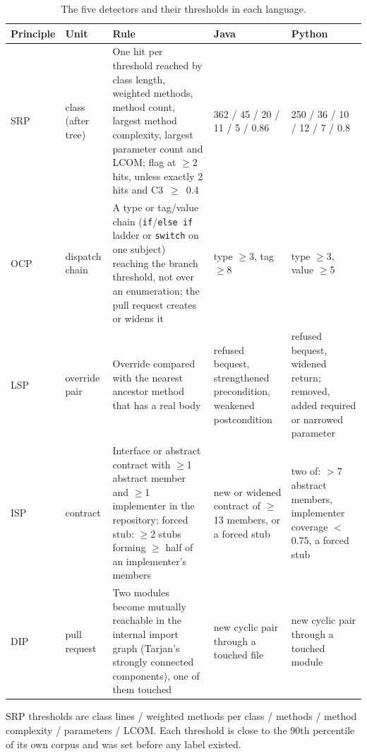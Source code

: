 \documentclass[sigconf]{acmart}
\begin{document}
\begin{table}[t]
\caption{The five detectors and their thresholds in each language.}
\label{tab:detectors}
\footnotesize
\begin{tabular}{@{}L{1.4cm}L{1.6cm}L{7.0cm}L{3.0cm}L{3.0cm}@{}}
\toprule
\textbf{Principle} & \textbf{Unit} & \textbf{Rule} & \textbf{Java} & \textbf{Python} \\
\midrule
SRP & class (after tree) & One hit per threshold reached by class length, weighted methods, method
count, largest method complexity, largest parameter count and LCOM; flag at $\geq$2 hits, unless
exactly 2 hits and C3~$\geq$~0.4 &
362 / 45 / 20 / 11 / 5 / 0.86 & 250 / 36 / 10 / 12 / 7 / 0.8 \\
\addlinespace
OCP & dispatch chain & A type or tag/value chain (\texttt{if}/\texttt{else if} ladder or
\texttt{switch} on one subject) reaching the branch threshold, not over an enumeration; the pull
request creates or widens it &
type $\geq$3, tag $\geq$8 & type $\geq$3, value $\geq$5 \\
\addlinespace
LSP & override pair & Override compared with the nearest ancestor method that has a real body &
refused bequest, strengthened precondition, weakened postcondition &
refused bequest, widened return; removed, added required or narrowed parameter \\
\addlinespace
ISP & contract & Interface or abstract contract with $\geq$1 abstract member and $\geq$1
implementer in the repository; forced stub: $\geq$2 stubs forming $\geq$ half of an implementer's
members &
new or widened contract of $\geq$13 members, or a forced stub &
two of: $>$7 abstract members, implementer coverage $<$0.75, a forced stub \\
\addlinespace
DIP & pull request & Two modules become mutually reachable in the internal import graph (Tarjan's
strongly connected components), one of them touched &
new cyclic pair through a touched file & new cyclic pair through a touched module \\
\bottomrule
\end{tabular}

\vspace{3pt}
\raggedright\scriptsize SRP thresholds are class lines / weighted methods per class / methods / method
complexity / parameters / LCOM. Each threshold is close to the 90th percentile of its own corpus and
was set before any label existed.
\end{table}
\end{document}
